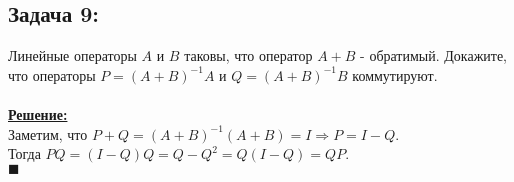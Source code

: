\documentclass[a4paper,12pt,titlepage,final]{article}
\begin{document}
\subsection*{Задача 9:}
\noindent Линейные операторы $A$ и $B$ таковы, что оператор $A + B$ - обратимый. Докажите, что операторы
$P = (A + B)^{-1}A$ и $Q = (A + B)^{-1}B$ коммутируют. \\ \\
\textbf{\underline{Решение:}} \\
Заметим, что $P + Q = (A + B)^{-1}(A + B) = I \Rightarrow P = I - Q$. \\
Тогда $PQ = (I - Q)Q = Q - Q^2 = Q(I - Q) = QP$. \\ $\blacksquare$ \\ \\ \\ 


\end{document}
